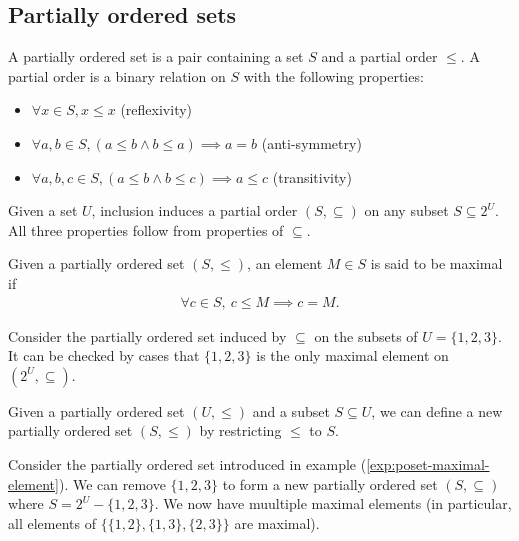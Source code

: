 \subsection{Partially ordered sets}\label{sec:appendix-poset}

\begin{defn}
 A partially ordered set is a pair containing a set $S$ and a partial order $\leq$. A partial order is a binary relation on $S$ with the following properties:
 \begin{itemize}
   \item $\forall x \in S, x \leq x$ (reflexivity)
   \item $\forall a, b \in S, (a \leq b \land b \leq a) \implies a = b$ (anti-symmetry)
   \item $\forall a, b, c \in S, (a \leq b \land b \leq c) \implies a \leq c$ (transitivity)
 \end{itemize}
 \end{defn}

 \begin{exmp}
   Given a set $U$, inclusion induces a partial order $(S, \subseteq )$ on any subset $S \subseteq 2 ^{U}$. All three properties follow from properties of $\subseteq $.
 \end{exmp}

 \begin{defn}
   Given a partially ordered set $(S, \leq )$, an element $M \in S$ is said to be maximal if 
   \begin{align*}
    \forall c \in S,\: c \leq M \implies c = M.
   \end{align*}
 \end{defn}

 \begin{exmp}\label{exp:poset-maximal-element}
   Consider the partially ordered set induced by $\subseteq$ on the subsets of $U = \{1, 2, 3\}$. It can be checked by cases that $\{1, 2, 3\}$ is the only maximal element on $(2 ^U, \subseteq )$.
 \end{exmp}


 \begin{remark}\label{rem:subsets-of-poset-are-posets}
   Given a partially ordered set $(U, \leq )$ and a subset $S \subseteq U$, we can define a new partially ordered set $(S, \leq )$ by restricting $\leq$ to $S$.
 \end{remark}

 \begin{exmp}
   Consider the partially ordered set introduced in example (\ref{exp:poset-maximal-element}). We can remove $\{1, 2, 3\}$ to form a new partially ordered set $(S, \subseteq )$ where $S = 2 ^U - \{1, 2, 3\}$. We now have muultiple maximal elements (in particular, all elements of $\{\{1, 2\}, \{1, 3\},\{2, 3\} \}$ are maximal).
 \end{exmp}

